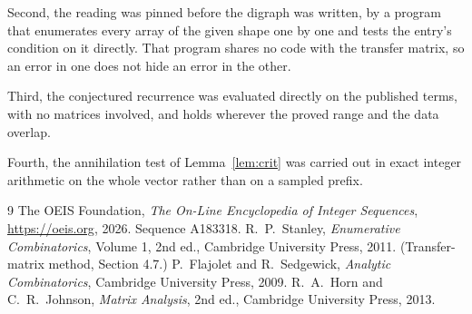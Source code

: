 \documentclass[11pt,a4paper]{article}
\theoremstyle{plain}
\theoremstyle{definition}
\begin{document}
Second, the reading was pinned before the digraph was written, by a program that enumerates
every array of the given shape one by one and tests the entry's condition on it directly. That program shares no code with the transfer matrix, so an error in one does not
hide an error in the other.

Third, the conjectured recurrence was evaluated directly on the published terms, with no
matrices involved, and holds wherever the proved range and the data overlap.

Fourth, the annihilation test of Lemma~\ref{lem:crit} was carried out in exact integer
arithmetic on the whole vector rather than on a sampled prefix.

\begin{thebibliography}{9}
 The OEIS Foundation, \emph{The On-Line Encyclopedia of Integer
Sequences}, \url{https://oeis.org}, 2026. Sequence A183318.
 R.~P.~Stanley, \emph{Enumerative Combinatorics}, Volume 1, 2nd ed.,
Cambridge University Press, 2011. (Transfer-matrix method, Section 4.7.)
 P.~Flajolet and R.~Sedgewick, \emph{Analytic Combinatorics}, Cambridge
University Press, 2009.
 R.~A.~Horn and C.~R.~Johnson, \emph{Matrix Analysis}, 2nd ed., Cambridge
University Press, 2013.
\end{thebibliography}
\end{document}
